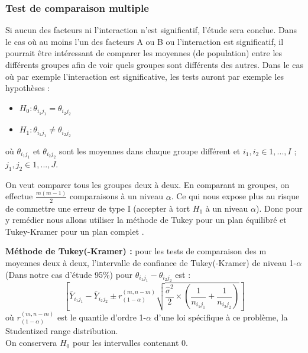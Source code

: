 \documentclass[12pt,a4paper]{article}
\begin{document}
	\subsubsection{Test de comparaison multiple}
	Si aucun des facteurs ni l'interaction n'est significatif, l'étude sera conclue. Dans le cas où au moins l'un des facteurs A ou B ou l'interaction est significatif, il pourrait être intéressant de comparer les moyennes (de population) entre les différents groupes afin de voir quels groupes sont différents des autres.
	Dans le cas où par exemple l'interaction est significative, les tests auront par exemple les hypothèses : 
	\begin{itemize}[label=--, leftmargin=*]
		\item $H_0 : \theta_{i_1j_1} = \theta_{i_2j_2}$
		\item $H_1 : \theta_{i_1j_1} \neq \theta_{i_2j_2}$
	\end{itemize}
	où $\theta_{i_1j_1}$ et $\theta_{i_2j_2}$ sont les moyennes dans chaque groupe différent et $i_1,i_2\in{1,...,I}$ ; $j_1,j_2\in{1,...,J}$.
	
	On veut comparer tous les groupes deux à deux. En comparant m groupes, on effectue $\frac{m(m-1)}{2}$ comparaisons à un niveau $\alpha$. Ce qui nous expose plus au risque de commettre une erreur de type I (accepter à tort $H_1$ à un niveau $\alpha$). Donc pour y remédier nous allons utiliser la méthode de Tukey pour un plan équilibré et Tukey-Kramer pour un plan complet \cite{maistre2023}.
	
	\begin{mdframed}[backgroundcolor=gray!20, hidealllines=true, innermargin=10pt, outermargin=10pt, skipabove=10pt, skipbelow=10pt, nobreak=true]
		\textbf{Méthode de Tukey(-Kramer) : }
		pour les tests de comparaison des m moyennes deux à deux, l'intervalle de confiance de Tukey(-Kramer) \cite{maistre2023} de niveau 1-$\alpha$ (Dans notre cas d'étude 95\%) pour $\theta_{i_1j_1} - \theta_{i_2j_2}$ est : 
		\begin{equation}
			\left [\bar{Y}_{i_1j_1}-\bar{Y}_{i_2j_2} \pm r^{(m,n-m)}_{(1-\alpha)}\sqrt{\frac{\hat{\sigma}^2}{2}\times\left(\frac{1}{n_{i_1j_1}}+\frac{1}{n_{i_2j_2}}\right)}\right]
		\end{equation}
		où $r^{(m,n-m)}_{(1-\alpha)}$ est le quantile d'ordre 1-$\alpha$ d'une loi spécifique à ce problème, la Studentized range distribution.\\
		On conservera $H_0$ pour les intervalles contenant 0.
	\end{mdframed}
\end{document}
